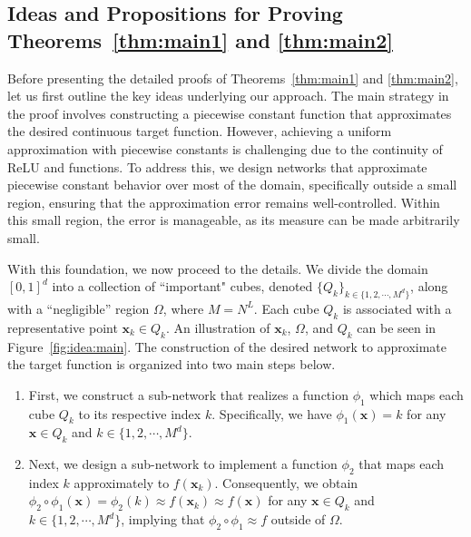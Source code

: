 \documentclass[11pt,a4paper]{article}
\begin{document}
\begin{itemize}
    
\end{itemize}

\subsection{Ideas and Propositions for Proving Theorems~\ref{thm:main1} and \ref{thm:main2}}
\label{sec:proof:ideas:thm:main}

Before presenting the detailed proofs of Theorems~\ref{thm:main1} and \ref{thm:main2}, let us first outline the key ideas underlying our approach. The main strategy in the proof involves constructing a piecewise constant function that approximates the desired continuous target function. However, achieving a uniform approximation with piecewise constants is challenging due to the continuity of ReLU and \sine{}  functions. To address this, we design networks that approximate piecewise constant behavior over most of the domain, specifically outside a small region, ensuring that the approximation error remains well-controlled. Within this small region, the error is manageable, as its measure can be made arbitrarily small.

With this foundation, we now proceed to the details. We divide the domain $[0,1]^d$ into a collection of ``important" cubes, denoted $\{Q_k\}_{k \in \{1,2,\cdots,M^d\}}$, along with a ``negligible'' region $\Omega$, where $M = N^L$. Each cube $Q_k$ is associated with a representative point $\bm{x}_k \in Q_k$. An illustration of $\bm{x}_k$, $\Omega$, and $Q_k$ can be seen in Figure~\ref{fig:idea:main}. The construction of the desired network to approximate the target function is organized into two main steps below.

\begin{enumerate}
    \item First, we construct a sub-network that realizes a function $\phi_1$ which maps each cube $Q_k$ to its respective index $k$. Specifically, we have $\phi_1(\bm{x}) = k$ for any $\bm{x} \in Q_k$ and $k \in \{1,2,\cdots,M^d\}$.
    
    \item Next, we design a sub-network to implement a function $\phi_2$ that maps each index $k$ approximately to $f(\bm{x}_k)$. Consequently, we obtain $\phi_2 \circ \phi_1(\bm{x}) = \phi_2(k) \approx f(\bm{x}_k) \approx f(\bm{x})$ for any $\bm{x} \in Q_k$ and $k \in \{1,2,\cdots,M^d\}$, implying that $\phi_2 \circ \phi_1 \approx f$ outside of $\Omega$.
\end{enumerate}
\end{document}
